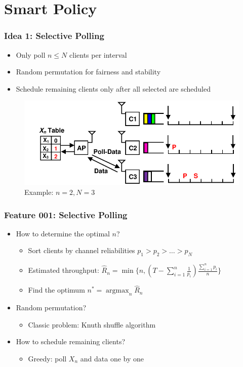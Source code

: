 \documentclass{beamer}
\newcommand{\argmax}{\operatorname{argmax}}
\begin{document}
\section{Smart Policy}

\begin{frame}
\frametitle{Idea 1: Selective Polling}
\begin{itemize}
\item Only poll $n \le N$ clients per interval
\item Random permutation for fairness and stability
\item Schedule remaining clients only after all selected are scheduled
\end{itemize}
\begin{figure}
\centering
\includegraphics[scale=0.8]{selective_1.pdf}
\caption{Example: $n=2, N=3$}
\end{figure}
\end{frame}

\begin{frame}
\frametitle{Feature 001: Selective Polling}
\begin{itemize}
\item How to determine the optimal $n$?
  \begin{itemize}
    \item Sort clients by channel reliabilities $p_1 > p_2 > \dots > p_N$
    \item Estimated throughput: $\hat{R}_n = \min\{n, (T-\sum_{i=1}^{n}\frac{1}{p_i})\frac{\sum_{i=1}^{n}p_i}{n} \}$
    \item Find the optimum $n^* = \argmax_{n} \hat{R}_n$
  \end{itemize}
\item Random permutation?
  \begin{itemize}
    \item Classic problem: Knuth shuffle algorithm
  \end{itemize}
\item How to schedule remaining clients?
  \begin{itemize}
    \item Greedy: poll $X_n$ and data one by one
  \end{itemize}
\end{itemize}
\end{frame}
\end{document}
